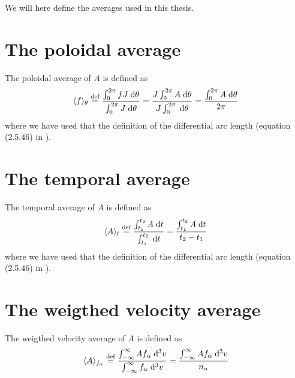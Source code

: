 %
We will here define the averages used in this thesis.
%
\section{The poloidal average}
\label{sec:polAvg}
%
The poloidal average of $A$ is defined as
%
\begin{align*}
    \langle{f}\rangle_\theta \overset{\text{def}}{=}
        \frac{
            \int_{0}^{2\pi} {fJ} \; \text{d} {\theta}
        }{
            \int_{0}^{2\pi} {J} \; \text{d} {\theta}
        }
    =
        \frac{
            J\int_{0}^{2\pi} {A} \; \text{d} {\theta}
        }{
            J\int_{0}^{2\pi} {} \; \text{d} {\theta}
        }
    =
        \frac{\int_{0}^{2\pi} {A} \; \text{d} {\theta}}{2\pi}
\end{align*}
%
where we have used that the definition of the differential arc length (equation (2.5.46) in \cite{Dhaeseleer1991book}).

\section{The temporal average}
%
The temporal average of $A$ is defined as
%
\begin{align*}
    \langle{A}\rangle_t \overset{\text{def}}{=}
        \frac{
            \int_{t_1}^{t_2} {A} \; \text{d} {t}
        }{
            \int_{t_1}^{t_2} {} \; \text{d} {t}
        }
    =
        \frac{\int_{t_1}^{t_2} {A} \; \text{d} {t}}{t_2-t_1}
\end{align*}
%
where we have used that the definition of the differential arc length (equation (2.5.46) in \cite{Dhaeseleer1991book}).

\section{The weigthed velocity average}
%
The weigthed velocity average of $A$ is defined as
%
\begin{align*}
    \langle{A}\rangle_{f_\alpha} \overset{\text{def}}{=}
        \frac{
            \int_{-\infty}^{\infty} {Af_\alpha} \; \text{d} {^3v}
        }{
            \int_{-\infty}^{\infty} {f_\alpha} \; \text{d} {^3v}
        }
    =
        \frac{\int_{-\infty}^{\infty} {Af_\alpha} \; \text{d} {^3v}}{n_\alpha}
\end{align*}

